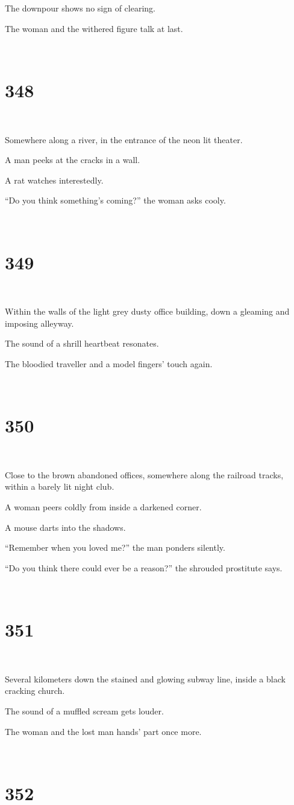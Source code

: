 \documentclass{report}
\begin{document}
The downpour shows no sign of clearing.

The woman and the withered figure talk at last.

~
\chapter*{348}
~

Somewhere along a river, in the entrance of the neon lit theater.

A man peeks at the cracks in a wall.

A rat watches interestedly.

``Do you think something's coming?'' the woman asks cooly.

~
\chapter*{349}
~

Within the walls of the light grey dusty office building, down a gleaming and imposing alleyway.

The sound of a shrill heartbeat resonates.

The bloodied traveller and a model fingers' touch again.

~
\chapter*{350}
~

Close to the brown abandoned offices, somewhere along the railroad tracks, within a barely lit night club.

A woman peers coldly from inside a darkened corner.

A mouse darts into the shadows.

``Remember when you loved me?'' the man ponders silently.

``Do you think there could ever be a reason?'' the shrouded prostitute says.

~
\chapter*{351}
~

Several kilometers down the stained and glowing subway line, inside a black cracking church.

The sound of a muffled scream gets louder.

The woman and the lost man hands' part once more.

~
\chapter*{352}
~
\end{document}
